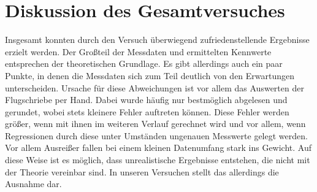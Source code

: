 \section{Diskussion des Gesamtversuches}
Insgesamt konnten durch den Versuch überwiegend zufriedenstellende Ergebnisse erzielt werden. Der Großteil der Messdaten und ermittelten Kennwerte entsprechen der theoretischen Grundlage. Es gibt allerdings auch ein paar Punkte, in denen die Messdaten sich zum Teil deutlich von den Erwartungen unterscheiden. Ursache für diese Abweichungen ist vor allem das Auswerten der Flugschriebe per Hand. Dabei wurde häufig nur bestmöglich abgelesen und gerundet, wobei stets kleinere Fehler auftreten können. Diese Fehler werden größer, wenn mit ihnen im weiteren Verlauf gerechnet wird und vor allem, wenn Regressionen durch diese unter Umständen ungenauen Messwerte gelegt werden. Vor allem Ausreißer fallen bei einem kleinen Datenumfang stark ins Gewicht. Auf diese Weise ist es möglich, dass unrealistische Ergebnisse entstehen, die nicht mit der Theorie vereinbar sind. In unseren Versuchen stellt das allerdings die Ausnahme dar.
